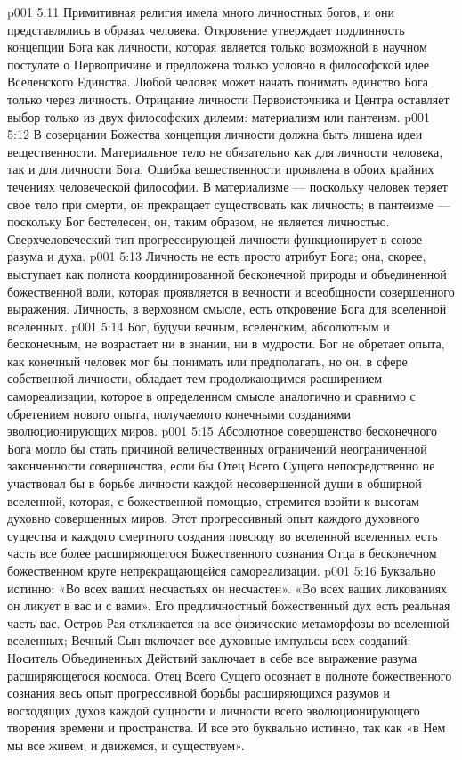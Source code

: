 \vs p001 5:11 Примитивная религия имела много личностных богов, и они представлялись в образах человека. Откровение утверждает подлинность концепции Бога как личности, которая является только возможной в научном постулате о Первопричине и предложена только условно в философской идее Вселенского Единства. Любой человек может начать понимать единство Бога только через личность. Отрицание личности Первоисточника и Центра оставляет выбор только из двух философских дилемм: материализм или пантеизм.
\vs p001 5:12 В созерцании Божества концепция личности должна быть лишена идеи вещественности. Материальное тело не обязательно как для личности человека, так и для личности Бога. Ошибка вещественности проявлена в обоих крайних течениях человеческой философии. В материализме --- поскольку человек теряет свое тело при смерти, он прекращает существовать как личность; в пантеизме --- поскольку Бог бестелесен, он, таким образом, не является личностью. Сверхчеловеческий тип прогрессирующей личности функционирует в союзе разума и духа.
\vs p001 5:13 \pc Личность не есть просто атрибут Бога; она, скорее, выступает как полнота координированной бесконечной природы и объединенной божественной воли, которая проявляется в вечности и всеобщности совершенного выражения. Личность, в верховном смысле, есть откровение Бога для вселенной вселенных.
\vs p001 5:14 \pc Бог, будучи вечным, вселенским, абсолютным и бесконечным, не возрастает ни в знании, ни в мудрости. Бог не обретает опыта, как конечный человек мог бы понимать или предполагать, но он, в сфере собственной личности, обладает тем продолжающимся расширением самореализации, которое в определенном смысле аналогично и сравнимо с обретением нового опыта, получаемого конечными созданиями эволюционирующих миров.
\vs p001 5:15 Абсолютное совершенство бесконечного Бога могло бы стать причиной величественных ограничений неограниченной законченности совершенства, если бы Отец Всего Сущего непосредственно не участвовал бы в борьбе личности каждой несовершенной души в обширной вселенной, которая, с божественной помощью, стремится взойти к высотам духовно совершенных миров. Этот прогрессивный опыт каждого духовного существа и каждого смертного создания повсюду во вселенной вселенных есть часть все более расширяющегося Божественного сознания Отца в бесконечном божественном круге непрекращающейся самореализации.
\vs p001 5:16 Буквально истинно: «Во всех ваших несчастьях он несчастен». «Во всех ваших ликованиях он ликует в вас и с вами». Его предличностный божественный дух есть реальная часть вас. Остров Рая откликается на все физические метаморфозы во вселенной вселенных; Вечный Сын включает все духовные импульсы всех созданий; Носитель Объединенных Действий заключает в себе все выражение разума расширяющегося космоса. Отец Всего Сущего осознает в полноте божественного сознания весь опыт прогрессивной борьбы расширяющихся разумов и восходящих духов каждой сущности и личности всего эволюционирующего творения времени и пространства. И все это буквально истинно, так как «в Нем мы все живем, и движемся, и существуем».
